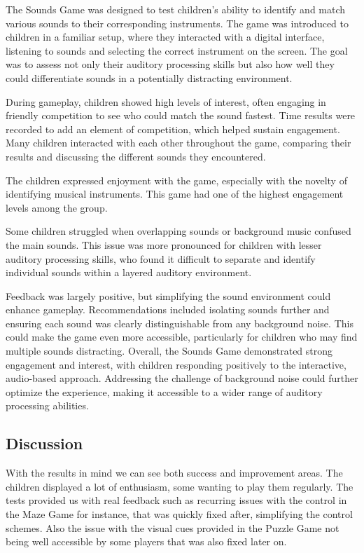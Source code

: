 The Sounds Game was designed to test children's ability to identify and match various sounds to their corresponding instruments. The game was introduced to children in a familiar setup, where they interacted with a digital interface, listening to sounds and selecting the correct instrument on the screen. The goal was to assess not only their auditory processing skills but also how well they could differentiate sounds in a potentially distracting environment.

During gameplay, children showed high levels of interest, often engaging in friendly competition to see who could match the sound fastest. Time results were recorded to add an element of competition, which helped sustain engagement. Many children interacted with each other throughout the game, comparing their results and discussing the different sounds they encountered.

The children expressed enjoyment with the game, especially with the novelty of identifying musical instruments. This game had one of the highest engagement levels among the group.

Some children struggled when overlapping sounds or background music confused the main sounds. This issue was more pronounced for children with lesser auditory processing skills, who found it difficult to separate and identify individual sounds within a layered auditory environment.

Feedback was largely positive, but simplifying the sound environment could enhance gameplay. Recommendations included isolating sounds further and ensuring each sound was clearly distinguishable from any background noise. This could make the game even more accessible, particularly for children who may find multiple sounds distracting.
Overall, the Sounds Game demonstrated strong engagement and interest, with children responding positively to the interactive, audio-based approach. Addressing the challenge of background noise could further optimize the experience, making it accessible to a wider range of auditory processing abilities.


\newpage
\subsection{Discussion}

With the results in mind we can see both success and improvement areas. The children displayed a lot of enthusiasm, some wanting to play them regularly. The tests provided us with real feedback such as recurring issues with the control in the Maze Game for instance, that was quickly fixed after, simplifying the control schemes. Also the issue with the visual cues provided in the Puzzle Game not being well accessible by some players that was also fixed later on.


